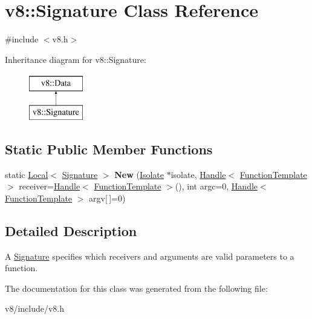 \hypertarget{classv8_1_1Signature}{}\section{v8\+:\+:Signature Class Reference}
\label{classv8_1_1Signature}


{\ttfamily \#include $<$v8.\+h$>$}

Inheritance diagram for v8\+:\+:Signature\+:\begin{figure}[H]
\begin{center}
\leavevmode
\includegraphics[height=2.000000cm]{classv8_1_1Signature}
\end{center}
\end{figure}
\subsection*{Static Public Member Functions}
\begin{DoxyCompactItemize}
\item 
\hypertarget{classv8_1_1Signature_a224e53e7ea0fc91b32758daf8b9a8718}{}static \hyperlink{classv8_1_1Local}{Local}$<$ \hyperlink{classv8_1_1Signature}{Signature} $>$ {\bfseries New} (\hyperlink{classv8_1_1Isolate}{Isolate} $\ast$isolate, \hyperlink{classv8_1_1Handle}{Handle}$<$ \hyperlink{classv8_1_1FunctionTemplate}{Function\+Template} $>$ receiver=\hyperlink{classv8_1_1Handle}{Handle}$<$ \hyperlink{classv8_1_1FunctionTemplate}{Function\+Template} $>$(), int argc=0, \hyperlink{classv8_1_1Handle}{Handle}$<$ \hyperlink{classv8_1_1FunctionTemplate}{Function\+Template} $>$ argv\mbox{[}$\,$\mbox{]}=0)\label{classv8_1_1Signature_a224e53e7ea0fc91b32758daf8b9a8718}

\end{DoxyCompactItemize}


\subsection{Detailed Description}
A \hyperlink{classv8_1_1Signature}{Signature} specifies which receivers and arguments are valid parameters to a function. 

The documentation for this class was generated from the following file\+:\begin{DoxyCompactItemize}
\item 
v8/include/v8.\+h\end{DoxyCompactItemize}
